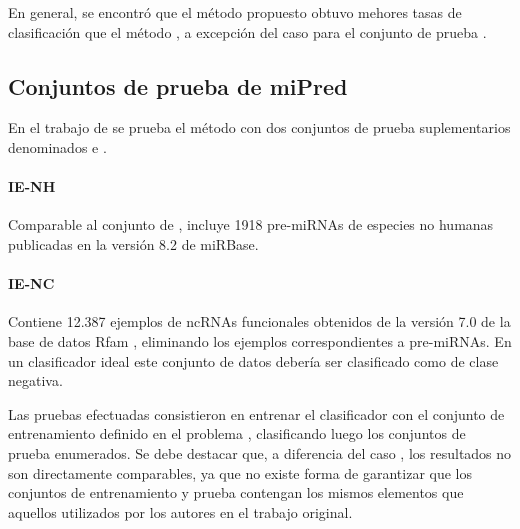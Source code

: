 En general, se encontró que el método propuesto obtuvo mehores tasas
de clasificación que el método \tripletsvm{}, a excepción del caso
 para el conjunto de prueba .

\subsection{Conjuntos de prueba de miPred}
En el trabajo de \citeauthor{ng} \cite{ng} se prueba el método
\mipred{} con dos conjuntos de prueba suplementarios denominados
 e .
\paragraph{IE-NH}
Comparable al conjunto  de \cite{xue}, incluye
1918 pre-miRNAs de especies no humanas publicadas en la versión 8.2 de
miRBase.
\paragraph{IE-NC}
Contiene 12.387 ejemplos de ncRNAs funcionales obtenidos de la versión
7.0 de la base de datos Rfam \cite{rfam}, eliminando los ejemplos
correspondientes a pre-miRNAs. En un clasificador ideal este conjunto
de datos debería ser clasificado como de clase negativa.

Las pruebas efectuadas consistieron en entrenar el clasificador con el
conjunto de entrenamiento definido en el problema \mipred{},
clasificando luego los conjuntos de prueba enumerados.  Se debe
destacar que, a diferencia del caso \tripletsvm{}, los resultados no
son directamente comparables, ya que no existe forma de garantizar que
los conjuntos de entrenamiento y prueba contengan los mismos elementos
que aquellos utilizados por los autores en el trabajo original.